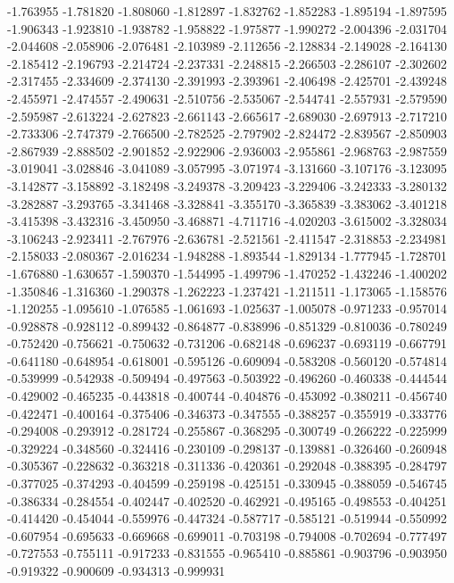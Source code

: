-1.763955
-1.781820
-1.808060
-1.812897
-1.832762
-1.852283
-1.895194
-1.897595
-1.906343
-1.923810
-1.938782
-1.958822
-1.975877
-1.990272
-2.004396
-2.031704
-2.044608
-2.058906
-2.076481
-2.103989
-2.112656
-2.128834
-2.149028
-2.164130
-2.185412
-2.196793
-2.214724
-2.237331
-2.248815
-2.266503
-2.286107
-2.302602
-2.317455
-2.334609
-2.374130
-2.391993
-2.393961
-2.406498
-2.425701
-2.439248
-2.455971
-2.474557
-2.490631
-2.510756
-2.535067
-2.544741
-2.557931
-2.579590
-2.595987
-2.613224
-2.627823
-2.661143
-2.665617
-2.689030
-2.697913
-2.717210
-2.733306
-2.747379
-2.766500
-2.782525
-2.797902
-2.824472
-2.839567
-2.850903
-2.867939
-2.888502
-2.901852
-2.922906
-2.936003
-2.955861
-2.968763
-2.987559
-3.019041
-3.028846
-3.041089
-3.057995
-3.071974
-3.131660
-3.107176
-3.123095
-3.142877
-3.158892
-3.182498
-3.249378
-3.209423
-3.229406
-3.242333
-3.280132
-3.282887
-3.293765
-3.341468
-3.328841
-3.355170
-3.365839
-3.383062
-3.401218
-3.415398
-3.432316
-3.450950
-3.468871
-4.711716
-4.020203
-3.615002
-3.328034
-3.106243
-2.923411
-2.767976
-2.636781
-2.521561
-2.411547
-2.318853
-2.234981
-2.158033
-2.080367
-2.016234
-1.948288
-1.893544
-1.829134
-1.777945
-1.728701
-1.676880
-1.630657
-1.590370
-1.544995
-1.499796
-1.470252
-1.432246
-1.400202
-1.350846
-1.316360
-1.290378
-1.262223
-1.237421
-1.211511
-1.173065
-1.158576
-1.120255
-1.095610
-1.076585
-1.061693
-1.025637
-1.005078
-0.971233
-0.957014
-0.928878
-0.928112
-0.899432
-0.864877
-0.838996
-0.851329
-0.810036
-0.780249
-0.752420
-0.756621
-0.750632
-0.731206
-0.682148
-0.696237
-0.693119
-0.667791
-0.641180
-0.648954
-0.618001
-0.595126
-0.609094
-0.583208
-0.560120
-0.574814
-0.539999
-0.542938
-0.509494
-0.497563
-0.503922
-0.496260
-0.460338
-0.444544
-0.429002
-0.465235
-0.443818
-0.400744
-0.404876
-0.453092
-0.380211
-0.456740
-0.422471
-0.400164
-0.375406
-0.346373
-0.347555
-0.388257
-0.355919
-0.333776
-0.294008
-0.293912
-0.281724
-0.255867
-0.368295
-0.300749
-0.266222
-0.225999
-0.329224
-0.348560
-0.324416
-0.230109
-0.298137
-0.139881
-0.326460
-0.260948
-0.305367
-0.228632
-0.363218
-0.311336
-0.420361
-0.292048
-0.388395
-0.284797
-0.377025
-0.374293
-0.404599
-0.259198
-0.425151
-0.330945
-0.388059
-0.546745
-0.386334
-0.284554
-0.402447
-0.402520
-0.462921
-0.495165
-0.498553
-0.404251
-0.414420
-0.454044
-0.559976
-0.447324
-0.587717
-0.585121
-0.519944
-0.550992
-0.607954
-0.695633
-0.669668
-0.699011
-0.703198
-0.794008
-0.702694
-0.777497
-0.727553
-0.755111
-0.917233
-0.831555
-0.965410
-0.885861
-0.903796
-0.903950
-0.919322
-0.900609
-0.934313
-0.999931
